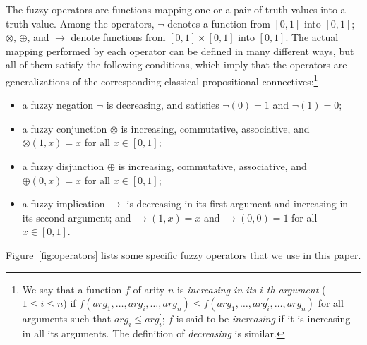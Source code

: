 \documentclass[runningheads]{llncs}
\def\rar{\rightarrow}
\def\fand{\otimes}
\def\for{\oplus}
\def\fneg{\neg}
\def\frar{\rar}
\begin{document}
The fuzzy operators are functions mapping one or a pair of truth values into
a truth value. Among the operators, $\fneg$ denotes a function from
$\left[0, 1\right]$ into $\left[0, 1\right]$; 
$\fand$, $\for$, and $\frar$ denote functions from 
$\left[0, 1\right]\times\left[0, 1\right]$ into $\left[0,
  1\right]$.
%
The actual mapping performed by each operator can be defined in many
different ways, but all of them satisfy the following conditions, 
which imply that the operators are generalizations of the
corresponding classical propositional connectives:\footnote{
We say that a function $f$ of arity $n$ is \emph{increasing in
  its $i$-th argument} ($1\leq i\leq n$) if
$f(arg_1,\dots, arg_i,\dots, arg_n)\leq
f(arg_1,\dots,arg_i^\prime,\dots, arg_n)$ for all arguments such that
$arg_i \leq arg_i^\prime$; 
$f$ is said to be \emph{increasing} if it is increasing in all its
arguments. The definition of \emph{decreasing} is similar. 
}
\begin{itemize}
\item a fuzzy negation $\fneg$ is decreasing, and satisfies $\neg(0) =
  1$ and $\neg(1) = 0$;

\item a fuzzy conjunction $\fand$ is increasing, commutative,
  associative, and $\fand(1, x)=x$ for all $x \in \left[0, 1\right]$;

\item a fuzzy disjunction $\for$ is increasing, commutative,
  associative, and $\for(0, x)=x$ for all $x\in \left[0, 1\right]$;

\item a fuzzy implication $\frar$ is decreasing in its first
  argument and increasing in its second argument; and $\frar(1, x) =
  x$ and $\frar(0, 0) = 1$ for all $x\in\left[0, 1\right]$.
\end{itemize}

Figure~\ref{fig:operators} lists some specific fuzzy operators that we
use in this paper.
\end{document}
